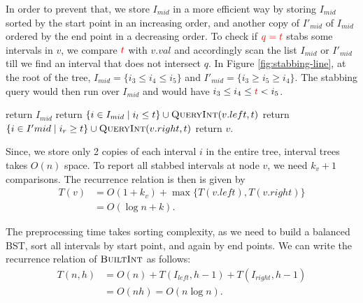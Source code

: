 In order to prevent that, we store $I_{mid}$ in a more efficient way by storing $I_{mid}$ sorted by the start point in an increasing order, and another copy of $I'_{mid}$ of $I_{mid}$ ordered by the end point in a decreasing order.
%
To check if $\textcolor{red}{q = t}$ stabs some intervals in $v$, we compare $\textcolor{red}{t} $ with $v.val$ and accordingly scan the list $I_{mid}$ or $I'_{mid}$ till we find an interval that does not intersect $q$.
%  
In Figure \ref{fig:stabbing-line}, at the root of the tree, $I_{mid} = \{ i_3 \leq  i_4 \leq i_5 \} $ and $I'_{mid} = \{ i_3 \geq  i_5 \geq i_4 \}$. 
%
The stabbing query would then run over $I_{mid}$ and would have $i_3 \leq i_4 \leq \textcolor{red}{t} < i_5$.  

\begin{algorithm}[H]
    \caption{} 
    \label{alg:build-interval}
    \begin{algorithmic}[1]
        		return $I_{mid}$
        	\EndIf
        		\State return $ \{ i \in I_{mid} \mid i_l \leq t \}  \cup \textsc{QueryInt}(v.left, t)$
       		\Else 
       			\State return $\{ i \in I'{mid} \mid  i_r \geq t\} \cup \textsc{QueryInt}(v.right, t)$
        	\EndIf
          \State return $v$.
        \EndFunction
    \end{algorithmic}
\end{algorithm}

Since, we store only 2 copies of each interval $i$ in the entire tree, interval trees takes $O(n)$ space.
%
To report all stabbed intervals at node $v$, we need $k_v +1 $ comparisons. The recurrence relation is then is given by
\begin{align*} 
T(v) &= O(1 + k_v) + \max \{T(v.left) , T(v.right) \}   \\
& = O(\log n + k).
\end{align*}

The preprocessing time takes sorting complexity, as we need to build a balanced BST, sort all intervals by start point, and again by end points. 
%
We can write the recurrence relation of $\textsc{BuiltInt}$ as follows:
\begin{align*}
	T(n, h) &= O(n) + T(I_{left}, h-1) + T (I_{right}, h-1) \\
	& = O(nh) = O(n \log n).  
\end{align*}

